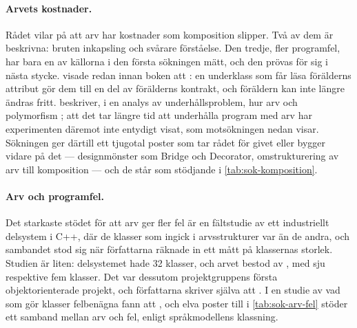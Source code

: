 \paragraph{Arvets kostnader.}  Rådet vilar på att arv har kostnader
som komposition slipper.  Två av dem är beskrivna: bruten inkapsling
och svårare förståelse.  Den tredje, fler programfel, har bara en av
källorna i den första sökningen mätt, och den prövas för sig i nästa
stycke.  \Textcite{Snyder1986} visade redan innan boken att
:
en underklass som får läsa förälderns attribut gör dem till en del av
förälderns kontrakt, och föräldern kan inte längre ändras fritt.
\Textcite{WildeHuitt1992} beskriver, i en analys av underhållsproblem,
hur arv och polymorfism ; att det tar
längre tid att underhålla program med arv har experimenten däremot inte
entydigt visat, som motsökningen nedan visar.  Sökningen ger därtill ett
tjugotal poster som tar rådet för givet eller bygger vidare på det ---
designmönster som Bridge och Decorator, omstrukturering av arv till
komposition --- och de står som stödjande i \cref{tab:sok-komposition}.

\paragraph{Arv och programfel.}  Det starkaste stödet för att arv ger
fler fel är en fältstudie av ett industriellt delsystem i C++, där de
klasser som ingick i arvsstrukturer var
 än de andra, och sambandet stod sig när författarna räknade
in ett mått på klassernas storlek.  Studien är liten: delsystemet hade 32
klasser, och arvet bestod av , med sju respektive fem klasser.  Det var dessutom
projektgruppens första objektorienterade projekt, och författarna skriver
själva att .  I en studie av
vad som gör klasser felbenägna fann \textcite{Briand2000Exploring}
att , och elva poster till i \cref{tab:sok-arv-fel} stöder
ett samband mellan arv och fel, enligt språkmodellens klassning.

